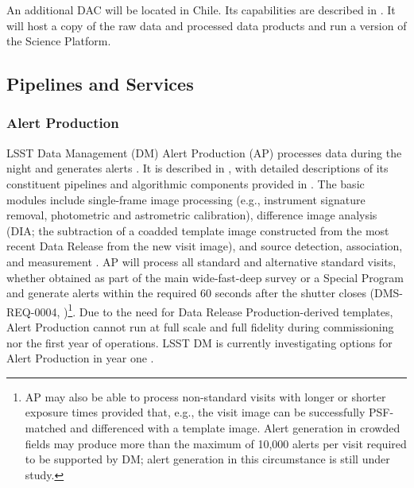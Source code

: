 An additional DAC will be located in Chile.
Its capabilities are described in .
It will host a copy of the raw data and processed data products and run a version of the Science Platform.

\subsection{Pipelines and Services}

\subsubsection{Alert Production}\label{sec:AP}

LSST Data Management (DM) Alert Production (AP) processes data during the night and generates alerts .
It is described in , with detailed descriptions of its constituent pipelines and algorithmic components provided in .
The basic modules include single-frame image processing (e.g., instrument signature removal, photometric and astrometric calibration), difference image analysis (DIA; the subtraction of a coadded template image constructed from the most recent Data Release from the new visit image), and source detection, association, and measurement .
AP will process all standard and alternative standard visits, whether obtained as part of the main wide-fast-deep survey or a Special Program  and generate alerts within the required 60 seconds after the shutter closes (DMS-REQ-0004, )\footnote{
AP may also be able to process non-standard visits with longer or shorter exposure times provided that, e.g., the visit image can be successfully PSF-matched and differenced with a template image.
Alert generation in crowded fields may produce more than the maximum of 10,000 alerts per visit required to be supported by DM; alert generation in this circumstance is still under study.
}.
Due to the need for Data Release Production-derived templates, Alert Production cannot run at full scale and full fidelity during commissioning nor the first year of operations.  LSST DM is currently investigating options for Alert Production in year one .

